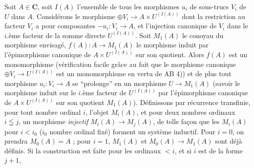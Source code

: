 Soit $A\in \mathbf{C}$, soit $I(A)$ l'ensemble de tous les morphismes $u_i$ de
sous-trucs $V_i$ de $U$ dans $A$. Considérons le morphisme
$\oplus V_i\to A\times U^{(I(A))}$ dont la restriction au facteur $V_i$ a pour composantes
$-u_i:V_i\to A$, et l'injection canonique de $V_i$ dans le $i$.ème
facteur de la somme directe $U^{(I(A))}$. Soit $M_1(A)$ le conoyau du morphisme
envisagé, $f(A):A\to M_1(A)$ le morphisme induit par
l'épimorphisme canonique de $A\times U^{(I(A))}$ sur son quotient. Alors
$f(A)$ est un monomorphisme (vérification facile grâce au fait que le morphisme
canonique $\oplus V_i\to U^{(I(A))}$ est un monomorphisme en
vertu de AB 4)) et de plus tout morphisme $u_i:V_i\to A$ se
``prolonge'' en un morphisme $U\to M_1(A)$ (savoir le morphisme
induit sur le $i$.ème facteur de $U^{(I(A))}$ par l'épimorphisme canonique de
$A\times U^{(I(A))}$ sur son quotient $M_1(A)$).
Définissons par récurrence transfinie, pour tout nombre ordinal $i$, l'objet
$M_i(A)$, et pour deux nombres ordinaux $i\leqq j$, un morphisme
\textit{injectif} $M_i(A)\to M_j(A)$, de telle façon que les
$M_i(A)$ pour $i<i_0$ ($i_0$ nombre ordinal fixé) forment un système inductif.
Pour $i=0$, on prendra $M_0(A)=A$ ; pour $i=1$, $M_1(A)$ et
$M_0(A)\to M_1(A)$ sont déjà définis. Si la construction est
faite pour les ordinaux $<i$, et si $i$ est de la forme $j+1$,

